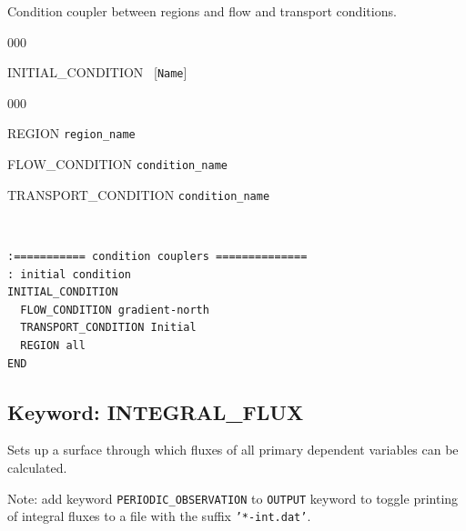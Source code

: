 \hfill\hyperlink{target_key}{\return}

 Condition coupler between regions and flow and transport conditions.

\begin{deflist}{000}
\item[INITIAL\_CONDITION] \ [{\tt Name}]
\begin{deflist}{000}
\item[REGION] {\tt region\_name}
\item[FLOW\_CONDITION] {\tt condition\_name}
\item[TRANSPORT\_CONDITION] {\tt condition\_name}
\end{deflist}
\item[\keyend] ~
\end{deflist}


\begin{mdframed}


\footnotesize
\begin{verbatim}
:=========== condition couplers ==============
: initial condition
INITIAL_CONDITION
  FLOW_CONDITION gradient-north
  TRANSPORT_CONDITION Initial
  REGION all
END
\end{verbatim}
\normalsize
\end{mdframed}

\hyperlink{target_key}{\return}

\newpage

\protect\hypertarget{target_int_flux}{}

\subsection{Keyword: INTEGRAL\_FLUX}

\hfill\hyperlink{target_key}{\return}

 Sets up a surface through which fluxes of all primary dependent variables can be calculated.

Note: add keyword {\tt PERIODIC\_OBSERVATION} to {\tt OUTPUT} keyword to toggle printing of integral fluxes to a file with the suffix {\tt '*-int.dat'}.

